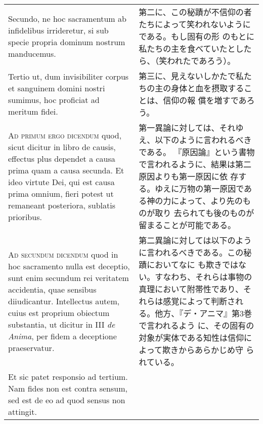 \documentclass[10pt]{jsarticle} %
\begin{document}
\begin{longtable}{p{21em}p{21em}}
\\


Secundo, ne hoc sacramentum ab infidelibus irrideretur, si sub
specie propria dominum nostrum manducemus. 


&

第二に、この秘蹟が不信仰の者たちによって笑われないようにである。もし固有の形
 のもとに私たちの主を食べていたとしたら、（笑われたであろう）。

\\


Tertio ut, dum
invisibiliter corpus et sanguinem domini nostri sumimus, hoc proficiat
ad meritum fidei.

&

第三に、見えないしかたで私たちの主の身体と血を摂取することは、信仰の報
 償を増すであろう。

\\



{\scshape Ad primum ergo dicendum} quod, sicut dicitur in libro de causis,
effectus plus dependet a causa prima quam a causa secunda. Et ideo
virtute Dei, qui est causa prima omnium, fieri potest ut remaneant
posteriora, sublatis prioribus.

&

第一異論に対しては、それゆえ、以下のように言われるべきである。
『原因論』という書物で言われるように、結果は第二原因よりも第一原因に依
 存する。ゆえに万物の第一原因である神の力によって、より先のものが取り
 去られても後のものが留まることが可能である。


\\



{\scshape Ad secundum dicendum} quod in hoc sacramento nulla est deceptio, sunt
enim secundum rei veritatem accidentia, quae sensibus
diiudicantur. Intellectus autem, cuius est proprium obiectum
substantia, ut dicitur in III {\itshape de Anima}, per fidem a deceptione
praeservatur.

&

第二異論に対しては以下のように言われるべきである。この秘蹟においてなに
 も欺きではない。すなわち、それらは事物の真理において附帯性であり、そ
 れらは感覚によって判断される。他方、『デ・アニマ』第3巻で言われるよう
 に、その固有の対象が実体である知性は信仰によって欺きからあらかじめ守
 られている。

\\



Et sic patet responsio ad tertium. Nam fides non est contra sensum,
sed est de eo ad quod sensus non attingit.


\end{longtable}
\end{document}
